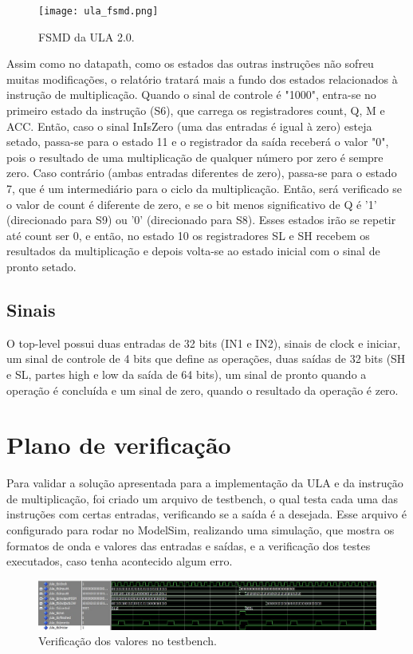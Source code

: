 \documentclass[conference]{IEEEtran}
\begin{document}
\begin{figure}[htbp]
\centerline{\texttt{[image: ula\_fsmd.png]}}
\caption{FSMD da ULA 2.0.}
\label{fig}
\end{figure}

Assim como no datapath, como os estados das outras instruções não sofreu muitas modificações, o relatório tratará mais a fundo dos estados relacionados à instrução de multiplicação. Quando o sinal de controle é "1000", entra-se no primeiro estado da instrução (S6), que carrega os registradores count, Q, M e ACC. Então, caso o sinal InIsZero (uma das entradas é igual à zero) esteja setado, passa-se para o estado 11 e o registrador da saída receberá o valor "0", pois o resultado de uma multiplicação de qualquer número por zero é sempre zero. Caso contrário (ambas entradas diferentes de zero), passa-se para o estado 7, que é um intermediário para o ciclo da multiplicação. Então, será verificado se o valor de count é diferente de zero, e se o bit menos significativo de Q é '1' (direcionado para S9) ou '0' (direcionado para S8). Esses estados irão se repetir até count ser 0, e então, no estado 10 os registradores SL e SH recebem os resultados da multiplicação e depois volta-se ao estado inicial com o sinal de pronto setado. 

\subsection{Sinais}
O top-level possui duas entradas de 32 bits (IN1 e IN2), sinais de clock e iniciar, um sinal de controle de 4 bits que define as operações, duas saídas de 32 bits (SH e SL, partes high e low da saída de 64 bits), um sinal de pronto quando a operação é concluída e um sinal de zero, quando o resultado da operação é zero.

\section{Plano de verificação}
Para validar a solução apresentada para a implementação da ULA e da instrução de multiplicação, foi criado um arquivo de testbench, o qual testa cada uma das instruções com certas entradas, verificando se a saída é a desejada. Esse arquivo é configurado para rodar no ModelSim, realizando uma simulação, que mostra os formatos de onda e valores das entradas e saídas, e a verificação dos testes executados, caso tenha acontecido algum erro. 

\begin{figure}[htbp]
\centerline{\includegraphics[scale=0.20]{testbench.jpeg}}
\caption{Verificação dos valores no testbench.}
\label{fig}
\end{figure}
\end{document}
